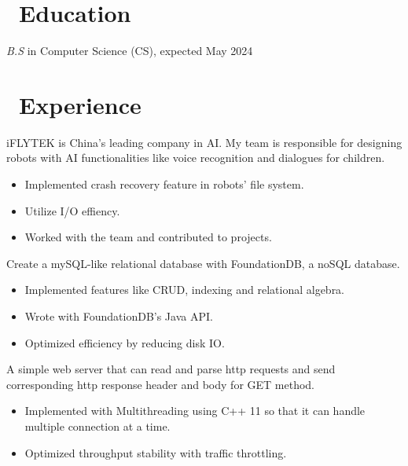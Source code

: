 \documentclass{resume}
\begin{document}



\section{\faGraduationCap\ Education}
\textit{B.S} in Computer Science (CS), expected May 2024

\section{\faUsers\ Experience}
  iFLYTEK is China's leading company in AI. My team is responsible for designing robots with AI functionalities like voice recognition and dialogues for children.
\begin{itemize}
  \item Implemented crash recovery feature in robots' file system.
  \item Utilize I/O effiency.
  \item Worked with the team and contributed to projects.
\end{itemize}

  Create a mySQL-like relational database with FoundationDB, a noSQL database.
\begin{itemize}
  \item Implemented features like CRUD, indexing and relational algebra.
  \item Wrote with FoundationDB's Java API.
  \item Optimized efficiency by reducing disk IO.
\end{itemize}

  A simple web server that can read and parse http requests and send corresponding http response header and body for GET method.
\begin{itemize}
  \item Implemented with Multithreading using C++ 11 so that it can handle multiple connection at a time.
  \item Optimized throughput stability with traffic throttling.
\end{itemize}
\end{document}
